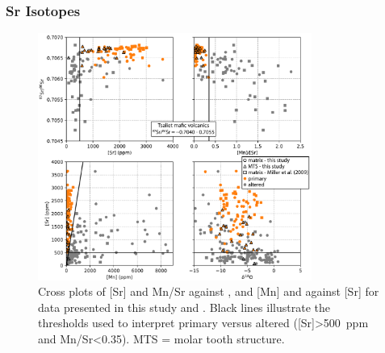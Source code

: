 \subsubsection{Sr Isotopes}

\begin{figure}[h!]
\begin{center}
	\includegraphics[width=0.8\textwidth]{figures/Tambien/Sr-diagenesis.pdf}
	\caption[Cross plots of Sr and Mn in carbonates.]{Cross plots of [Sr] and Mn/Sr against \SrSr, and [Mn] and \dO against [Sr] for data presented in this study and \citet{Miller2009a}. Black lines illustrate the thresholds used to interpret primary versus altered \SrSr ([Sr]\textgreater500~ppm and Mn/Sr\textless0.35). MTS = molar tooth structure.}
	\label{fig:Sr-diagenesis}
\end{center}
\end{figure}

